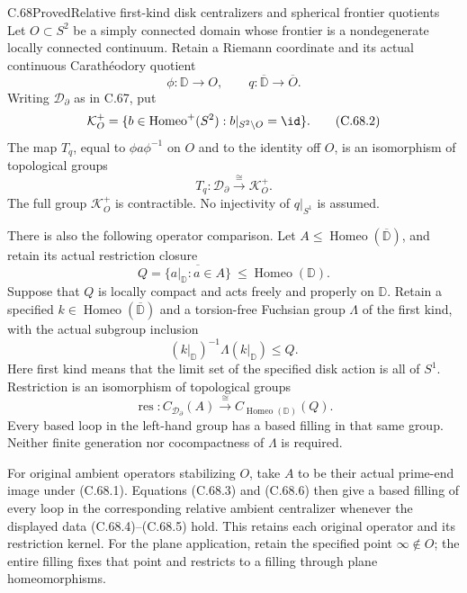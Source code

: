 \begin{claim}{C.68}{Proved}{Relative first-kind disk centralizers and spherical frontier quotients}
Let $O\subset S^2$ be a simply connected domain whose
frontier is a nondegenerate locally connected continuum.
Retain a Riemann coordinate and its actual continuous
Carath\'eodory quotient
\[
 \phi:\mathbb D\longrightarrow O,\qquad
 q:\overline{\mathbb D}\longrightarrow\overline O .
                                                               \tag{C.68.1}
\]
Writing $\mathcal D_\partial$ as in C.67, put
\[
 \mathcal K_O^+
  =\{b\in\operatorname{Homeo}^+(S^2):
                         b|_{S^2\setminus O}=\id\}.
                                                               \tag{C.68.2}
\]
The map $T_q$, equal to $\phi a\phi^{-1}$ on $O$
and to the identity off $O$, is an isomorphism of
topological groups
\[
                  T_q:\mathcal D_\partial
                              \xrightarrow{\ \cong\ }\mathcal K_O^+.
                                                               \tag{C.68.3}
\]
The full group $\mathcal K_O^+$ is contractible.
No injectivity of $q|_{S^1}$ is assumed.

There is also the following operator comparison.
Let $A\leq\operatorname{Homeo}(\overline{\mathbb D})$,
and retain its actual restriction closure
\[
 Q=\overline{\{a|_{\mathbb D}:a\in A\}}
             \ \leq\operatorname{Homeo}(\mathbb D).
                                                               \tag{C.68.4}
\]
Suppose that $Q$ is locally compact and acts freely
and properly on $\mathbb D$. Retain a specified
$k\in\operatorname{Homeo}(\overline{\mathbb D})$ and
a torsion-free Fuchsian group $\Lambda$ of the first
kind, with the actual subgroup inclusion
\[
       (k|_{\mathbb D})^{-1}\Lambda(k|_{\mathbb D})\leq Q .
                                                               \tag{C.68.5}
\]
Here first kind means that the limit set of the
specified disk action is all of $S^1$.
Restriction is an isomorphism of topological groups
\[
 \operatorname{res}:
       C_{\mathcal D_\partial}(A)
       \xrightarrow{\ \cong\ }
       C_{\operatorname{Homeo}(\mathbb D)}(Q).
                                                               \tag{C.68.6}
\]
Every based loop in the left-hand group has a based
filling in that same group.
Neither finite generation nor cocompactness of
$\Lambda$ is required.

For original ambient operators stabilizing $O$,
take $A$ to be their actual prime-end image under
(C.68.1). Equations (C.68.3) and (C.68.6) then
give a based filling of every loop in the corresponding
relative ambient centralizer whenever the displayed
data (C.68.4)--(C.68.5) hold. This retains each original
operator and its restriction kernel.
For the plane application, retain the specified
point $\infty\notin O$; the entire filling fixes
that point and restricts to a filling through
plane homeomorphisms.
\end{claim}

